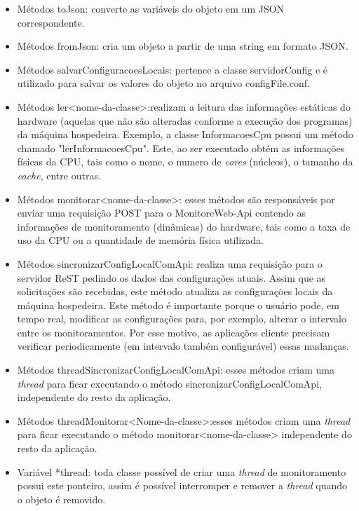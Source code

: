 \begin{itemize}
	\item Métodos toJson: converte as variáveis do objeto em um JSON correspondente.
	
	\item Métodos fromJson: cria um objeto a partir de uma string em formato JSON.
	
	\item Métodos salvarConfiguracoesLocais: pertence a classe servidorConfig e é utilizado para salvar os valores do objeto no arquivo configFile.conf. 
	
	\item Métodos ler<nome-da-classe>:realizam a leitura das informações estáticas do hardware (aquelas que não são alteradas conforme a execução dos programas) da máquina hospedeira. Exemplo, a classe InformacoesCpu possui um método chamado "lerInformacoesCpu". Este, ao ser executado obtém as informações físicas da CPU, tais como o nome, o numero de \textit{cores} (núcleos), o tamanho da \textit{cache}, entre outras.
	
	\item Métodos monitorar<nome-da-classe>: esses métodos são responsáveis por enviar uma requisição POST para o MonitoreWeb-Api contendo as informações de monitoramento (dinâmicas) do hardware, tais como a taxa de uso da CPU ou a quantidade de memória física utilizada.
	
	\item Métodos sincronizarConfigLocalComApi: realiza uma requisição para o servidor ReST pedindo os dados das configurações atuais. Assim que as solicitações são recebidas, este método atualiza as configurações locais da máquina hospedeira. Este método é importante porque o usuário pode, em tempo real, modificar as configurações para, por exemplo, alterar o intervalo entre os monitoramentos. Por esse motivo, as aplicações cliente precisam verificar periodicamente (em intervalo também configurável) essas mudanças.
    
    \item Métodos threadSincronizarConfigLocalComApi: esses métodos criam uma \textit{thread} para ficar executando o método sincronizarConfigLocalComApi, independente do resto da aplicação.
    
    \item Métodos threadMonitorar<Nome-da-classe>:esses métodos criam uma \textit{thread} para ficar executando o método monitorar<nome-da-classe> independente do resto da aplicação.
    
    \item Variável *thread: toda classe possível de criar uma \textit{thread} de monitoramento possui este ponteiro, assim é possível interromper e remover a \textit{thread} quando o objeto é removido.
\end{itemize}



